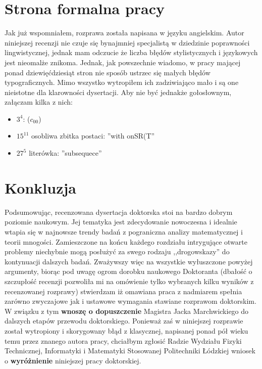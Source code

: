 \documentclass[12pt]{article}
\begin{document}
\section{Strona formalna pracy}

Jak już wspomniałem, rozprawa została napisana w języku angielskim. 
Autor niniejszej recenzji nie czuje się
bynajmniej specjalistą w dziedzinie poprawności lingwistycznej, jednak
mam odczucie że liczba błędów stylistycznych i językowych jest 
nieomalże znikoma. Jednak, jak powszechnie wiadomo, w pracy mającej ponad dziewięćdziesiąt
stron nie sposób ustrzec się małych błędów typograficznych. Mimo
wszystko wytropiłem ich zadziwiająco mało i są one 
nieistotne dla klarowności dysertacji. Aby nie być 
jednakże gołosłownym, załączam kilka z nich:

\begin{itemize}
\item
  $3^4$: ($c_{00}$)
\item 
  $15^{11}$ osobliwa zbitka postaci: ''with onSR(T''
\item
  $27^5$ literówka: ''subsequece''
\end{itemize}

\section{Konkluzja}
Podsumowując, recenzowana dysertacja doktorska stoi
na bardzo dobrym poziomie naukowym. Jej tematyka jest
zdecydowanie nowoczesna i idealnie wtapia się w najnowsze
trendy badań z pograniczna analizy matematycznej i teorii mnogości.
Zamieszczone na końcu każdego rozdziału intrygujące otwarte problemy
niechybnie mogą posłużyć za swego rodzaju ,,drogowskazy'' 
do kontynuacji dalszych badań.
  Zważywszy więc na wszystkie wyłuszczone powyżej argumenty,
biorąc pod uwagę ogrom dorobku naukowego Doktoranta (dbałość o 
szczupłość recenzji pozwoliła mi na omówienie tylko wybranych
kilku wyników z recenzowanej rozprawy) stwierdzam iż omawiana 
praca z nadmiarem spełnia zarówno zwyczajowe jak i ustawowe
wymagania stawiane rozprawom doktorskim. W związku z tym
{\bf wnoszę o dopuszczenie} Magistra Jacka Marchwickiego do dalszych
etapów przewodu doktorskiego.
  Ponieważ zaś w niniejszej rozprawie został wytropiony i 
skorygowany błąd z klasycznej, napisanej ponad pół wieku temu przez znanego
autora pracy, chciałbym zgłosić Radzie Wydziału Fizyki 
Technicznej, Informatyki i Matematyki Stosowanej Politechniki
Łódzkiej wniosek o {\bf wyróżnienie} niniejszej pracy doktorskiej.
\end{document}
